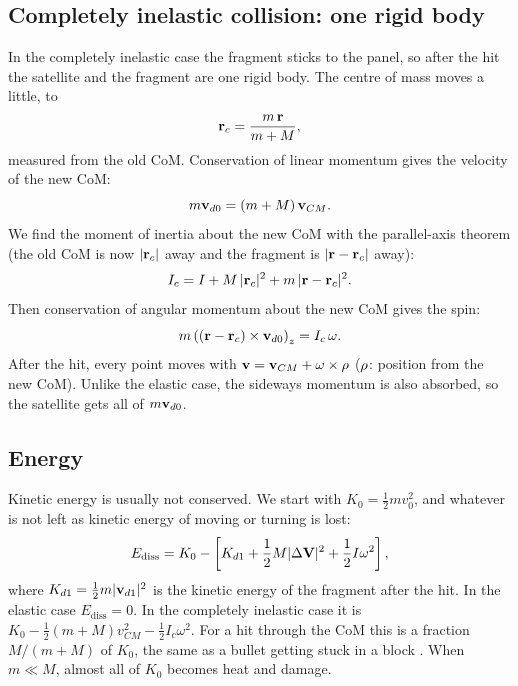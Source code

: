 \subsection{Completely inelastic collision: one rigid body}

In the completely inelastic case the fragment sticks to the panel, so after
the hit the satellite and the fragment are one rigid body. The centre of
mass moves a little, to
\begin{equation}
  \mathbf{r}_c=\frac{m\,\mathbf{r}}{m+M},
  \label{eq:rc}
\end{equation}
measured from the old CoM. Conservation of linear momentum gives the
velocity of the new CoM:
\begin{equation}
  m\mathbf{v}_{d0}=(m+M)\,\mathbf{v}_{CM}.
  \label{eq:vcm}
\end{equation}
We find the moment of inertia about the new CoM with the parallel-axis
theorem (the old CoM is now $|\mathbf{r}_c|$ away and the fragment is
$|\mathbf{r}-\mathbf{r}_c|$ away):
\begin{equation}
  I_c = I + M\,|\mathbf{r}_c|^{2} + m\,|\mathbf{r}-\mathbf{r}_c|^{2}.
  \label{eq:Ic}
\end{equation}
Then conservation of angular momentum about the new CoM gives the spin:
\begin{equation}
  m\left((\mathbf{r}-\mathbf{r}_c)\times\mathbf{v}_{d0}\right)_z = I_c\,\omega .
  \label{eq:omega-inelastic}
\end{equation}
After the hit, every point moves with
$\mathbf{v}=\mathbf{v}_{CM}+\mathbf{\omega}\times\mathbf{\rho}$ ($\mathbf{\rho}$: position
from the new CoM). Unlike the elastic case, the sideways momentum is also
absorbed, so the satellite gets all of $m\mathbf{v}_{d0}$.

\subsection{Energy}

Kinetic energy is usually not conserved. We start with $K_0 = \frac{1}{2}mv_0^2$, and whatever is not left as kinetic energy of moving or turning is lost:
\begin{equation}
    E_{\text{diss}} = K_0 - \left[K_{d1} + \frac{1}{2}M|\Delta\mathbf{V}|^2 + \frac{1}{2}I\omega^2\right],
  \label{eq:ediss}
\end{equation}
where $K_{d1} = \frac{1}{2}m|\mathbf{v}_{d1}|^2$ is the kinetic energy of the fragment after the hit. In the elastic case $E_{\text{diss}} = 0$. In the completely inelastic case it is $K_0 - \frac{1}{2}(m + M)v_{CM}^2 - \frac{1}{2}I_c\omega^2$. For a hit through the CoM this is a fraction $M / (m + M)$ of $K_0$, the same as a bullet getting stuck in a block \citep{halliday2014}. When $m \ll M$, almost all of $K_0$ becomes heat and damage.
